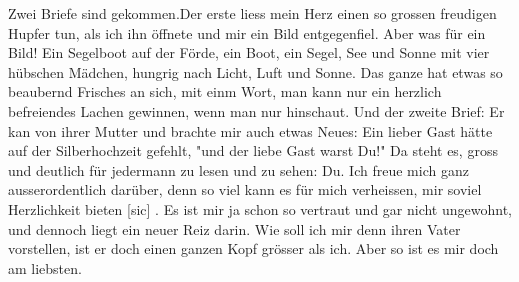 \def\day{5. November 1942}
\mktitle

Zwei Briefe sind gekommen.Der erste liess mein Herz einen so grossen freudigen Hupfer tun, als ich ihn \"{o}ffnete und mir ein Bild entgegenfiel.
Aber was f\"{u}r ein Bild!
Ein Segelboot auf der F\"{o}rde, ein Boot, ein Segel, See und Sonne mit vier h\"{u}bschen M\"{a}dchen, hungrig nach Licht, Luft und Sonne.
Das ganze hat etwas so beaubernd Frisches an sich, mit einm Wort, man kann nur ein herzlich befreiendes Lachen gewinnen, wenn man nur hinschaut.
Und der zweite Brief: Er kan von ihrer Mutter und brachte mir auch etwas Neues: Ein lieber Gast h\"{a}tte auf der Silberhochzeit gefehlt, "und der liebe Gast warst Du!"
Da steht es, gross und deutlich f\"{u}r jedermann zu lesen und zu sehen: Du.
Ich freue mich ganz ausserordentlich dar\"{u}ber, denn so viel kann es f\"{u}r mich verheissen, mir soviel Herzlichkeit bieten{\color{red} [sic] }.
Es ist mir ja schon so vertraut und gar nicht ungewohnt, und dennoch liegt ein neuer Reiz darin.
Wie soll ich mir denn ihren Vater vorstellen, ist er doch einen ganzen Kopf gr\"{o}sser als ich.
Aber so ist es mir doch am liebsten.

\clearpage

